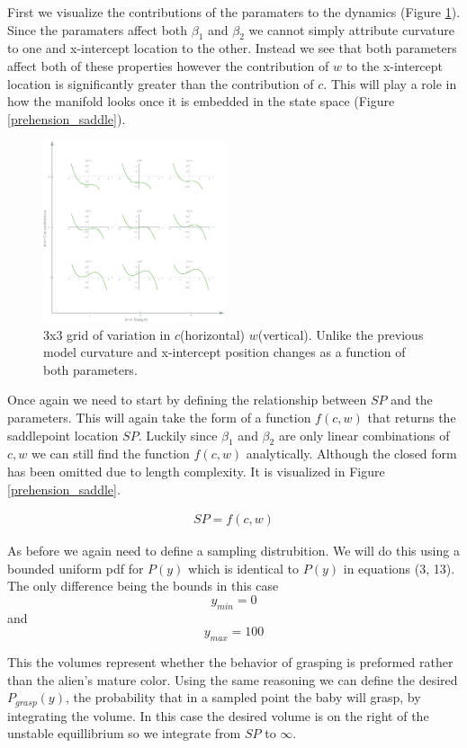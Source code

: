 \documentclass[letterpaper]{article}
\begin{document}
First we visualize the contributions of the paramaters to the dynamics 
(Figure \ref{fig5}).
Since the paramaters affect both $\beta_1$ and $\beta_2$ we cannot simply attribute 
curvature to one and x-intercept location to the other. 
Instead we see that both parameters
affect both of these properties however the contribution of 
$w$ to the x-intercept location
is significantly greater than the contribution of $c$. 
This will play a role in how the
manifold looks once it is embedded in the state space 
(Figure \ref{prehension_saddle}).

\begin{figure}[t]
\begin{center}
\includegraphics[width=2.1in,angle=0]{./prehension_params.png}
\caption{3x3 grid of variation in $c$(horizontal) $w$(vertical). Unlike the previous
model curvature and x-intercept position changes as a function of both parameters.}
\label{fig5}
\end{center}
\end{figure}

Once again we need to start by defining the relationship between $SP$ and 
the parameters.
This will again take the form of a function $f(c,w)$ that returns the 
saddlepoint location 
$SP$.
Luckily since $\beta_1$ and $\beta_2$ are only linear combinations of $c,w$ we can still
find the function $f(c,w)$ analytically. Although the closed form 
has been omitted due to length
complexity. It is visualized in Figure \ref{prehension_saddle}.

\begin{eqnarray}
  SP = f(c,w)
\end{eqnarray}

As before we again
need to define a sampling distrubition. We will do this using a bounded uniform
pdf for $P(y)$ which is identical to $P(y)$ in equations (3, 13). 
The only difference being the bounds in this case
\[
  y_{min} = 0
  \] 
  and 
  \[y_{max} = 100\]

This the volumes represent whether the behavior of grasping
is preformed rather than the alien's mature
color. Using the same reasoning we can define the desired $P_{grasp}(y)$, 
the probability
that in a sampled point the baby will grasp, by integrating the volume. In this case
the desired volume is on the right of the unstable equillibrium 
so we integrate from $SP$ to $\infty$.
\end{document}
